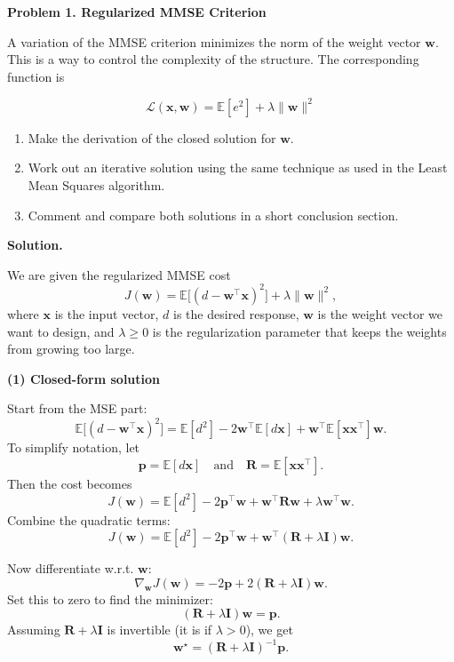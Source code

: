 \documentclass[11pt]{article}
\begin{document}
	
	\noindent\textbf{Problem 1. Regularized MMSE Criterion}
	
	\noindent
	A variation of the MMSE criterion minimizes the norm of the weight vector $\mathbf{w}$. 
	This is a way to control the complexity of the structure. The corresponding function is
	
	\[
	\mathcal{L}(\mathbf{x}, \mathbf{w}) = \mathbb{E}[e^2] + \lambda \lVert \mathbf{w} \rVert^2
	\]
	
	\begin{enumerate}[label=\textbf{(\arabic*)}, leftmargin=1.2cm]
		\item Make the derivation of the closed solution for $\mathbf{w}$.
		\item Work out an iterative solution using the same technique as used in the Least Mean Squares algorithm.
		\item Comment and compare both solutions in a short conclusion section.
	\end{enumerate}
	
	\vspace{1em}
	\noindent\textbf{Solution.}
	
	We are given the regularized MMSE cost
	\[
	J(\mathbf{w}) = \mathbb{E}\big[(d - \mathbf{w}^\top \mathbf{x})^2\big] + \lambda \lVert \mathbf{w} \rVert^2,
	\]
	where $\mathbf{x}$ is the input vector, $d$ is the desired response, $\mathbf{w}$ is the weight vector we want to design, and $\lambda \ge 0$ is the regularization parameter that keeps the weights from growing too large.
	
	\medskip
	\noindent\textbf{(1) Closed-form solution}
	
	Start from the MSE part:
	\[
	\mathbb{E}\big[(d - \mathbf{w}^\top \mathbf{x})^2\big]
	= \mathbb{E}[d^2] - 2 \mathbf{w}^\top \mathbb{E}[d \mathbf{x}] + \mathbf{w}^\top \mathbb{E}[\mathbf{x}\mathbf{x}^\top]\mathbf{w}.
	\]
	To simplify notation, let
	\[
	\mathbf{p} = \mathbb{E}[d \mathbf{x}] \quad \text{and} \quad \mathbf{R} = \mathbb{E}[\mathbf{x}\mathbf{x}^\top].
	\]
	Then the cost becomes
	\[
	J(\mathbf{w}) = \mathbb{E}[d^2]
	- 2 \mathbf{p}^\top \mathbf{w}
	+ \mathbf{w}^\top \mathbf{R} \mathbf{w}
	+ \lambda \mathbf{w}^\top \mathbf{w}.
	\]
	Combine the quadratic terms:
	\[
	J(\mathbf{w}) = \mathbb{E}[d^2] - 2 \mathbf{p}^\top \mathbf{w}
	+ \mathbf{w}^\top (\mathbf{R} + \lambda \mathbf{I}) \mathbf{w}.
	\]
	
	Now differentiate w.r.t. $\mathbf{w}$:
	\[
	\nabla_{\mathbf{w}} J(\mathbf{w}) = -2 \mathbf{p} + 2(\mathbf{R} + \lambda \mathbf{I}) \mathbf{w}.
	\]
	Set this to zero to find the minimizer:
	\[
	(\mathbf{R} + \lambda \mathbf{I}) \mathbf{w} = \mathbf{p}.
	\]
	Assuming $\mathbf{R} + \lambda \mathbf{I}$ is invertible (it is if $\lambda>0$), we get
	\[
	\boxed{\mathbf{w}^\star = (\mathbf{R} + \lambda \mathbf{I})^{-1} \mathbf{p}.}
	\]
	
\end{document}
